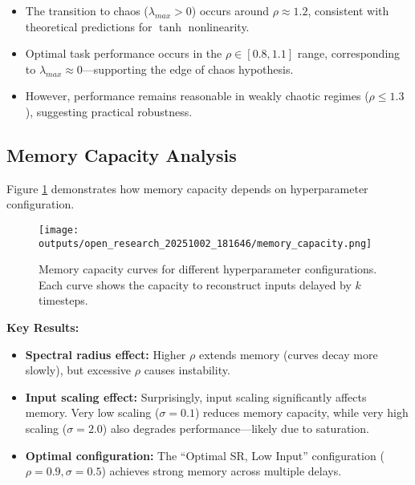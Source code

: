 \documentclass[11pt]{article}
\begin{document}
\begin{itemize}
    \item The transition to chaos ($\lambda_{max} > 0$) occurs around $\rho \approx 1.2$, consistent with theoretical predictions for $\tanh$ nonlinearity.
    
    \item Optimal task performance occurs in the $\rho \in [0.8, 1.1]$ range, corresponding to $\lambda_{max} \approx 0$—supporting the edge of chaos hypothesis.
    
    \item However, performance remains reasonable in weakly chaotic regimes ($\rho \leq 1.3$), suggesting practical robustness.
\end{itemize}

\subsection{Memory Capacity Analysis}

Figure \ref{fig:memory} demonstrates how memory capacity depends on hyperparameter configuration.

\begin{figure}[h]
    \centering
    \texttt{[image: outputs/open\_research\_20251002\_181646/memory\_capacity.png]}
    \caption{Memory capacity curves for different hyperparameter configurations. Each curve shows the capacity to reconstruct inputs delayed by $k$ timesteps.}
    \label{fig:memory}
\end{figure}

\textbf{Key Results:}

\begin{itemize}
    \item \textbf{Spectral radius effect:} Higher $\rho$ extends memory (curves decay more slowly), but excessive $\rho$ causes instability.
    
    \item \textbf{Input scaling effect:} Surprisingly, input scaling significantly affects memory. Very low scaling ($\sigma = 0.1$) reduces memory capacity, while very high scaling ($\sigma = 2.0$) also degrades performance—likely due to saturation.
    
    \item \textbf{Optimal configuration:} The ``Optimal SR, Low Input'' configuration ($\rho=0.9, \sigma=0.5$) achieves strong memory across multiple delays.
\end{itemize}
\end{document}
